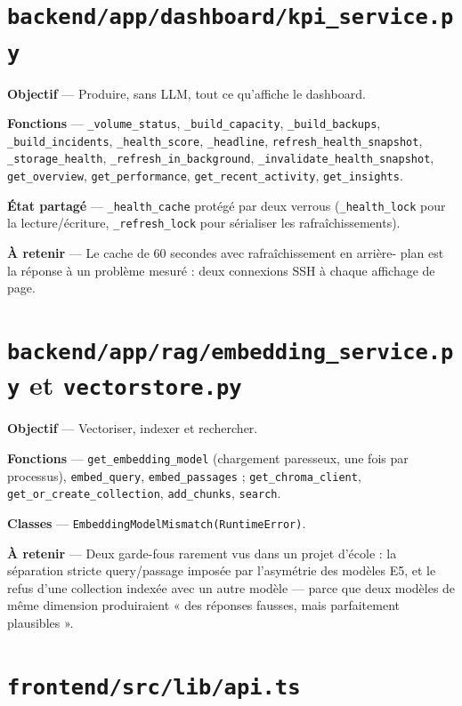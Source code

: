 \documentclass[11pt,a4paper]{report}
\newcommand{\file}[1]{\texttt{\small #1}}
\newcommand{\fn}[1]{\texttt{\small\textcolor{oasisviolet}{#1}}}
\newcommand{\cls}[1]{\texttt{\small\textcolor{oasisblue}{#1}}}
\begin{document}
\section{\file{backend/app/dashboard/kpi\_service.py}}

\textbf{Objectif} --- Produire, sans LLM, tout ce qu'affiche le dashboard.

\textbf{Fonctions} --- \fn{\_volume\_status}, \fn{\_build\_capacity},
\fn{\_build\_backups}, \fn{\_build\_incidents}, \fn{\_health\_score},
\fn{\_headline}, \fn{refresh\_health\_snapshot}, \fn{\_storage\_health},
\fn{\_refresh\_in\_background}, \fn{\_invalidate\_health\_snapshot},
\fn{get\_overview}, \fn{get\_performance}, \fn{get\_recent\_activity},
\fn{get\_insights}.

\textbf{État partagé} --- \texttt{\_health\_cache} protégé par deux verrous
(\texttt{\_health\_lock} pour la lecture/écriture, \texttt{\_refresh\_lock} pour
sérialiser les rafraîchissements).

\textbf{À retenir} --- Le cache de 60 secondes avec rafraîchissement en arrière-
plan est la réponse à un problème mesuré : deux connexions SSH à chaque
affichage de page.

\section{\file{backend/app/rag/embedding\_service.py} et \file{vectorstore.py}}

\textbf{Objectif} --- Vectoriser, indexer et rechercher.

\textbf{Fonctions} --- \fn{get\_embedding\_model} (chargement paresseux, une
fois par processus), \fn{embed\_query}, \fn{embed\_passages} ;
\fn{get\_chroma\_client}, \fn{get\_or\_create\_collection}, \fn{add\_chunks},
\fn{search}.

\textbf{Classes} --- \cls{EmbeddingModelMismatch(RuntimeError)}.

\textbf{À retenir} --- Deux garde-fous rarement vus dans un projet d'école : la
séparation stricte query/passage imposée par l'asymétrie des modèles E5, et le
refus d'une collection indexée avec un autre modèle --- parce que deux modèles
de même dimension produiraient « des réponses fausses, mais parfaitement
plausibles ».

\section{\file{frontend/src/lib/api.ts}}
\end{document}
